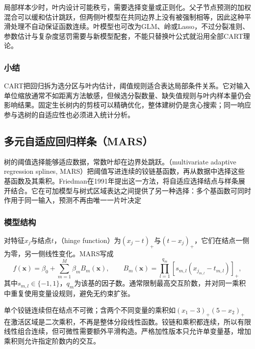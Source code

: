 局部样本少时，叶内设计可能秩亏，需要选择变量或正则化。父子节点预测的加权混合可以缓和估计跳跃，但两侧叶模型在共同边界上没有被强制相等，因此这种平滑处理不自动保证函数连续。叶模型也可改为GLM、岭或Lasso，不过分裂准则、参数估计与复杂度惩罚需要与新模型配套，不能只替换叶公式就沿用全部CART理论。

\subsubsection{小结}

CART把回归拆为选分区与叶内估计，阈值规则适合表达局部条件关系。它对输入单位缩放通常不如距离方法敏感，但候选分裂数量、缺失值规则与叶内样本量仍会影响结果。固定生长树内的剪枝可以精确优化，整体建树仍是贪心搜索；同一响应参与选树的自适应性也必须进入统计分析。

\subsection{多元自适应回归样条（MARS）}
\label{sec:regression-mars}

树的阈值选择能够适应数据，常数叶却在边界处跳跃。（multivariate adaptive regression splines, MARS）把阈值写进连续的铰链基函数，再从数据中选择这些基函数及其乘积。Friedman在1991年提出这一方法，将自适应选择结点与样条展开结合。它在可加模型与树式区域表达之间提供了另一种选择：多个基函数可同时作用于同一输入，预测不再由唯一一片叶决定

\subsubsection{模型结构}

对特征$x_j$与结点$t$，（hinge function）为$(x_j-t)_+$与$(t-x_j)_+$，它们在结点一侧为零，另一侧线性变化。MARS写成
\begin{equation}
  f(\bm{x})=\beta_0+\sum_{m=1}^{M}\beta_m B_m(\bm{x}),
  \qquad
  B_m(\bm{x})=\prod_{l=1}^{q_m}
                 [s_{m,l}(x_{j_{m,l}}-t_{m,l})]_+,
  \label{eq:regression-mars}
\end{equation}
其中$s_{m,l}\in\{-1,1\}$，$q_m$为该基的因子数。通常限制最高交互阶数，并对同一乘积中重复使用变量设规则，避免无约束扩张。

单个铰链连续但在结点不可微；含两个不同变量的乘积如$(x_1-3)_+(5-x_2)_+$在激活区域是二次乘积，不再是整体分段线性函数。铰链和乘积都连续，所以有限线性组合连续，但可微性需要额外平滑构造。严格加性版本只允许单变量基，增加乘积则允许指定阶数内的交互。


